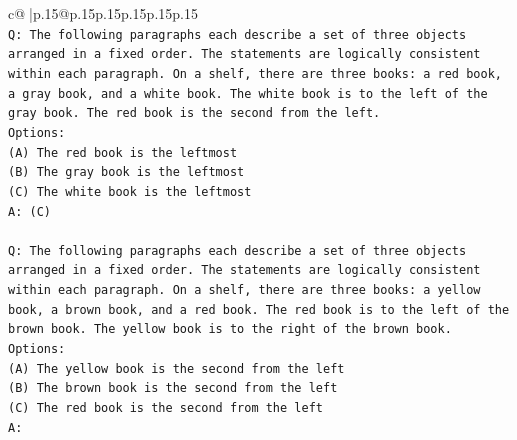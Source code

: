 \documentclass{article}
\begin{document}
{\begin{supertabular}{c@{$\;$}|p{.15\linewidth}@{}p{.15\linewidth}p{.15\linewidth}p{.15\linewidth}p{.15\linewidth}p{.15\linewidth}}
{{{\\ 
\texttt{Q: The following paragraphs each describe a set of three objects arranged in a fixed order. The statements are logically consistent within each paragraph. On a shelf, there are three books: a red book, a gray book, and a white book. The white book is to the left of the gray book. The red book is the second from the left.} \\
\texttt{Options:} \\
\texttt{(A) The red book is the leftmost} \\
\texttt{(B) The gray book is the leftmost} \\
\texttt{(C) The white book is the leftmost} \\
\texttt{A: (C)} \\
\\ 
\texttt{Q: The following paragraphs each describe a set of three objects arranged in a fixed order. The statements are logically consistent within each paragraph. On a shelf, there are three books: a yellow book, a brown book, and a red book. The red book is to the left of the brown book. The yellow book is to the right of the brown book.} \\
\texttt{Options:} \\
\texttt{(A) The yellow book is the second from the left} \\
\texttt{(B) The brown book is the second from the left} \\
\texttt{(C) The red book is the second from the left} \\
\texttt{A:} \\
            }
        }
    }
     \\ \\


\end{supertabular}}
\end{document}
